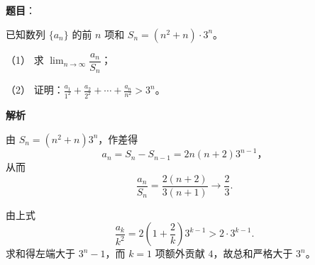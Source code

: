 \begin{answer}

\textbf{题目}：

已知数列 $\{a_n\}$ 的前 $n$ 项和 $S_n=(n^2+n)\cdot3^n$。

（1） 求 $\displaystyle\lim_{n\to\infty}\dfrac{a_n}{S_n}$；

（2） 证明：$\displaystyle\frac{a_1}{1^2}+\frac{a_2}{2^2}+\cdots+\frac{a_n}{n^2}>3^n$。

\textbf{解析}


由 $S_n=(n^2+n)3^n$，作差得
\nopagebreak[4]
\[
a_n=S_n-S_{n-1}=2n(n+2)3^{n-1}\text{，}
\]
从而
\nopagebreak[4]
\[
\frac{a_n}{S_n}=\frac{2(n+2)}{3(n+1)}\longrightarrow\frac23.
\]


由上式
\nopagebreak[4]
\[
\frac{a_k}{k^2}=2\left(1+\frac2k\right)3^{k-1}>2\cdot3^{k-1}.
\]
求和得左端大于 $3^n-1$，而 $k=1$ 项额外贡献 $4$，故总和严格大于
$3^n$。



\end{answer}